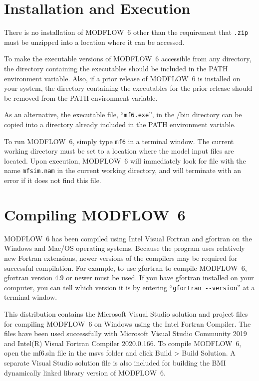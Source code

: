\documentclass[11pt,twoside,twocolumn]{usgsreport}
\begin{document}
\section{Installation and Execution}
There is no installation of MODFLOW~6 other than the requirement that \texttt{\modflowversion.zip} must be unzipped into a location where it can be accessed.  

To make the executable versions of MODFLOW~6 accessible from any directory, the directory containing the executables should be included in the PATH environment variable.  Also, if a prior release of MODFLOW~6 is installed on your system, the directory containing the executables for the prior release should be removed from the PATH environment variable.

As an alternative, the executable file, ``\texttt{mf6.exe}'', in the \modflowversion{}/bin directory can be copied into a directory already included in the PATH environment variable.

To run MODFLOW~6, simply type \texttt{mf6} in a terminal window.  The current working directory must be set to a location where the model input files are located.  Upon execution, MODFLOW~6 will immediately look for file with the name \texttt{mfsim.nam} in the current working directory, and will terminate with an error if it does not find this file.

\section{Compiling MODFLOW~6}
MODFLOW~6 has been compiled using Intel Visual Fortran and gfortran on the Windows and Mac/OS operating systems.  Because the program uses relatively new Fortran extensions, newer versions of the compilers may be required for successful compilation.  For example, to use gfortran to compile MODFLOW~6, gfortran version 4.9 or newer must be used.  If you have gfortran installed on your computer, you can tell which version it is by entering ``\verb|gfortran --version|'' at a terminal window.

This distribution contains the Microsoft Visual Studio solution and project files for compiling MODFLOW~6 on Windows using the Intel Fortran Compiler.  The files have been used successfully with Microsoft Visual Studio Community 2019 and Intel(R) Visual Fortran Compiler 2020.0.166.  To compile MODFLOW~6, open the mf6.sln file in the msvs folder and click Build >  Build Solution.  A separate Visual Studio solution file is also included for building the BMI dynamically linked library version of MODFLOW~6.
\end{document}
